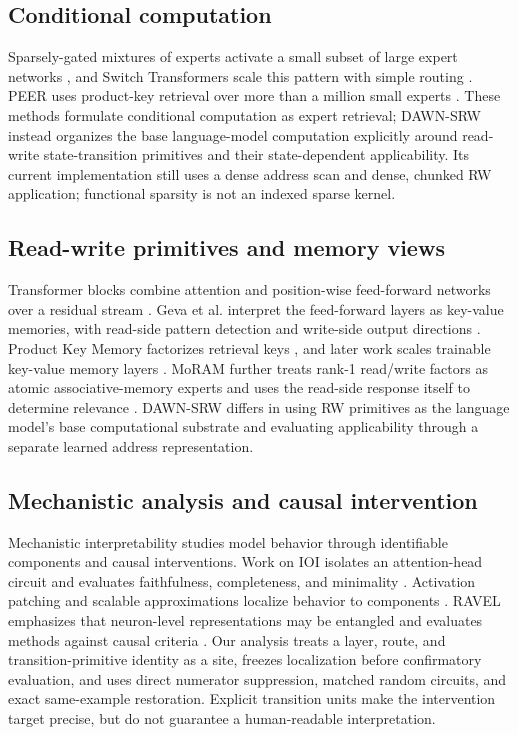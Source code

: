 \documentclass{article}
\newcommand{\DAWN}{DAWN-SRW}
\begin{document}
\subsection{Conditional computation}

Sparsely-gated mixtures of experts activate a small subset of large expert
networks \cite{shazeer2017outrageously}, and Switch Transformers scale this
pattern with simple routing \cite{fedus2022switch}. PEER uses product-key
retrieval over more than a million small experts \cite{he2024mixture}. These
methods formulate conditional computation as expert retrieval; \DAWN{} instead
organizes the base language-model computation explicitly around read-write
state-transition primitives and their state-dependent applicability. Its
current implementation still uses a dense address scan and dense, chunked RW
application; functional sparsity is not an indexed sparse kernel.

\subsection{Read-write primitives and memory views}

Transformer blocks combine attention and position-wise feed-forward networks
over a residual stream \cite{vaswani2017attention}. Geva et al. interpret the
feed-forward layers as key-value memories, with read-side pattern detection and
write-side output directions \cite{geva2021transformer}. Product Key Memory
factorizes retrieval keys \cite{lample2019large}, and later work scales
trainable key-value memory layers \cite{berges2024memory}. MoRAM further treats
rank-1 read/write factors as atomic associative-memory experts and uses the
read-side response itself to determine relevance \cite{lu2026little}.
\DAWN{} differs in using RW primitives as the language model's base
computational substrate and evaluating applicability through a separate
learned address representation.

\subsection{Mechanistic analysis and causal intervention}

Mechanistic interpretability studies model behavior through identifiable
components and causal interventions. Work on IOI isolates an attention-head
circuit and evaluates faithfulness, completeness, and minimality
\cite{wang2023interpretability}. Activation patching and scalable
approximations localize behavior to components \cite{kramar2024atp}. RAVEL
emphasizes that neuron-level representations may be entangled and evaluates
methods against causal criteria \cite{huang2024ravel}. Our analysis treats a
layer, route, and transition-primitive identity as a site, freezes localization
before confirmatory evaluation, and uses direct numerator suppression, matched
random circuits, and exact same-example restoration. Explicit transition units
make the intervention target precise, but do not guarantee a human-readable
interpretation.
\end{document}
